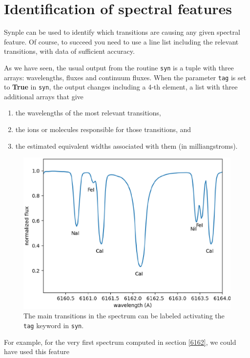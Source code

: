 \documentclass[]{article}
\begin{document}
\section{Identification of spectral features}
\label{tag}

Synple can be used to identify which transitions are causing any given spectral feature. Of course, to succeed you need to use a line list including the relevant transitions, with data of sufficient accuracy.

As we have seen, the usual output from the routine {\tt syn} is a tuple with three arrays: wavelengths, fluxes and continuum fluxes. When the parameter {\tt tag} is set to {\bf True} in {\tt syn}, the output changes including a 4-th element, a list with three additional arrays that give 
\begin{enumerate}
\item the wavelengths of the most relevant transitions, 
\item the ions or molecules responsible for those transitions, and
\item the estimated equivalent widths associated with them (in milliangstroms).
\end{enumerate}


\begin{figure}[t!]
\centering
\includegraphics[width=14cm]{Figure_6.ps}
\caption{The main transitions in the spectrum can be labeled activating the {\tt tag} keyword in {\tt syn}.
\label{tagging}
}
\end{figure}

For example, for the very first spectrum computed in section \ref{6162}, we could have used this feature
\end{document}
